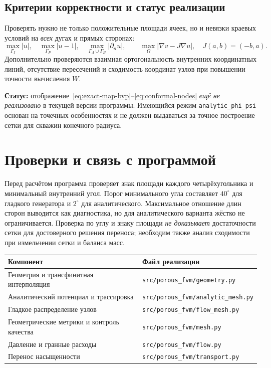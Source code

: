 \documentclass[12pt,a4paper]{article}
\begin{document}
\subsection{Критерии корректности и статус реализации}

Проверять нужно не только положительные площади ячеек, но и невязки
краевых условий на \emph{всех} дугах и прямых сторонах:
\begin{equation}
 \max_{\Gamma_I}|u|,\quad
 \max_{\Gamma_P}|u-1|,\quad
 \max_{\Gamma_A\cup\Gamma_B}|\partial_nu|,
 \qquad
 \max_{\Omega}|\nabla v-J\nabla u|,
 \quad J(a,b)=(-b,a).
 \label{eq:map-checks}
\end{equation}
Дополнительно проверяются взаимная ортогональность внутренних координатных
линий, отсутствие пересечений и сходимость координат узлов при повышении
точности вычисления $W$.

\textbf{Статус:} отображение~\eqref{eq:exact-map-bvp}--\eqref{eq:conformal-nodes}
\emph{ещё не реализовано} в текущей версии программы. Имеющийся режим
\texttt{analytic\_phi\_psi} основан на точечных особенностях и не должен
выдаваться за точное построение сетки для скважин конечного радиуса.

\section{Проверки и связь с программой}

Перед расчётом программа проверяет знак площади каждого четырёхугольника
и минимальный внутренний угол. Порог минимального угла составляет $40^\circ$
для гладкого генератора и $2^\circ$ для аналитического. Максимальное
отношение длин сторон выводится как диагностика, но для аналитического
варианта жёстко не ограничивается. Проверка по углу и знаку площади
\emph{не доказывает} достаточности сетки для достоверного решения переноса;
необходим также анализ сходимости при измельчении сетки и баланса масс.

\begin{center}
\begin{tabular}{@{}ll@{}}
\toprule
Компонент & Файл реализации \\
\midrule
Геометрия и трансфинитная интерполяция & \texttt{src/porous\_fvm/geometry.py} \\
Аналитический потенциал и трассировка & \texttt{src/porous\_fvm/analytic\_mesh.py} \\
Гладкое распределение узлов & \texttt{src/porous\_fvm/flow\_mesh.py} \\
Геометрические метрики и контроль качества & \texttt{src/porous\_fvm/mesh.py} \\
Давление и гранные расходы & \texttt{src/porous\_fvm/flow.py} \\
Перенос насыщенности & \texttt{src/porous\_fvm/transport.py} \\
\bottomrule
\end{tabular}
\end{center}
\end{document}
